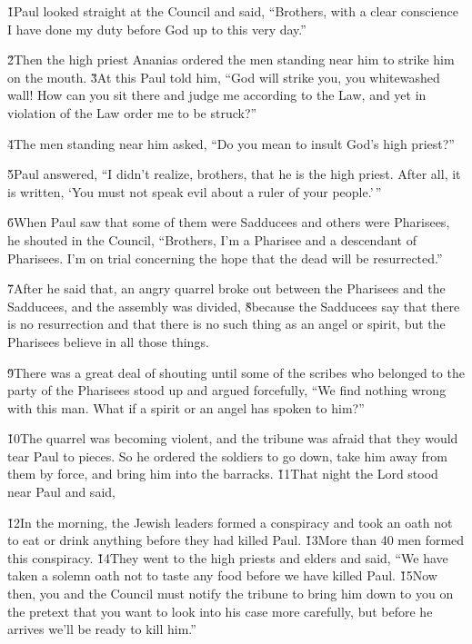 \v{1}Paul looked straight at the Council and said, ``Brothers, with a clear conscience I have done my duty before God up to this very day.''

\v{2}Then the high priest Ananias ordered the men standing near him to strike him on the mouth. \v{3}At this Paul told him, ``God will strike you, you whitewashed wall! How can you sit there and judge me according to the Law, and yet in violation of the Law order me to be struck?''

\v{4}The men standing near him asked, ``Do you mean to insult God's high priest?''

\v{5}Paul answered, ``I didn't realize, brothers, that he is the high priest. After all, it is written, `You must not speak evil about a ruler of your people.'\,''

\v{6}When Paul saw that some of them were Sadducees and others were Pharisees, he shouted in the Council, ``Brothers, I'm a Pharisee and a descendant of Pharisees. I'm on trial concerning the hope that the dead will be resurrected.''

\v{7}After he said that, an angry quarrel broke out between the Pharisees and the Sadducees, and the assembly was divided, \v{8}because the Sadducees say that there is no resurrection and that there is no such thing as an angel or spirit, but the Pharisees believe in all those things.

\v{9}There was a great deal of shouting until some of the scribes who belonged to the party of the Pharisees stood up and argued forcefully, ``We find nothing wrong with this man. What if a spirit or an angel has spoken to him?''

\v{10}The quarrel was becoming violent, and the tribune was afraid that they would tear Paul to pieces. So he ordered the soldiers to go down, take him away from them by force, and bring him into the barracks. \v{11}That night the Lord stood near Paul and said, 

\v{12}In the morning, the Jewish leaders formed a conspiracy and took an oath not to eat or drink anything before they had killed Paul. \v{13}More than 40 men formed this conspiracy. \v{14}They went to the high priests and elders and said, ``We have taken a solemn oath not to taste any food before we have killed Paul. \v{15}Now then, you and the Council must notify the tribune to bring him down to you on the pretext that you want to look into his case more carefully, but before he arrives we'll be ready to kill him.''

